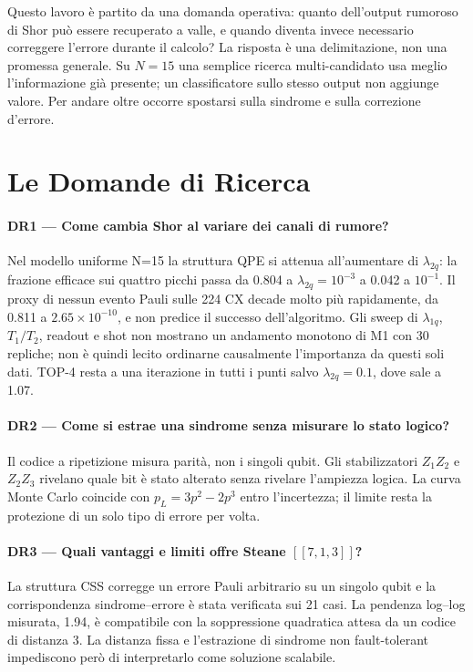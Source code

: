 \begin{onehalfspace}

Questo lavoro è partito da una domanda operativa: quanto dell'output
rumoroso di Shor può essere recuperato a valle, e quando diventa invece
necessario correggere l'errore durante il calcolo? La risposta è una
delimitazione, non una promessa generale. Su $N=15$ una semplice ricerca
multi-candidato usa meglio l'informazione già presente; un classificatore
sullo stesso output non aggiunge valore. Per andare oltre occorre
spostarsi sulla sindrome e sulla correzione d'errore.

\section{Le Domande di Ricerca}
\label{sec:risposte_dr}

\paragraph{DR1 --- Come cambia Shor al variare dei canali di rumore?}
Nel modello uniforme N=15 la struttura QPE si attenua all'aumentare di
$\lambda_{2q}$: la frazione efficace sui quattro picchi passa da 0.804 a
$\lambda_{2q}=10^{-3}$ a 0.042 a $10^{-1}$. Il proxy di nessun evento
Pauli sulle 224 CX decade molto più rapidamente, da 0.811 a
$2.65\times10^{-10}$, e non predice il successo dell'algoritmo. Gli
sweep di $\lambda_{1q}$, $T_1/T_2$, readout e shot non mostrano un
andamento monotono di M1 con 30 repliche; non è quindi lecito ordinarne
causalmente l'importanza da questi soli dati. TOP-4 resta a una
iterazione in tutti i punti salvo $\lambda_{2q}=0.1$, dove sale a 1.07.

\paragraph{DR2 --- Come si estrae una sindrome senza misurare lo stato
logico?}
Il codice a ripetizione misura parità, non i singoli qubit. Gli
stabilizzatori $Z_1Z_2$ e $Z_2Z_3$ rivelano quale bit è stato alterato
senza rivelare l'ampiezza logica. La curva Monte Carlo coincide con
$p_L=3p^2-2p^3$ entro l'incertezza; il limite resta la protezione di un
solo tipo di errore per volta.

\paragraph{DR3 --- Quali vantaggi e limiti offre Steane $[[7,1,3]]$?}
La struttura CSS corregge un errore Pauli arbitrario su un singolo qubit
e la corrispondenza sindrome--errore è stata verificata sui 21 casi. La
pendenza log--log misurata, 1.94, è compatibile con la soppressione
quadratica attesa da un codice di distanza 3. La distanza fissa e
l'estrazione di sindrome non fault-tolerant impediscono però di
interpretarlo come soluzione scalabile.


\end{onehalfspace}
